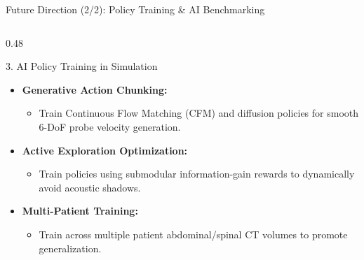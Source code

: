 \documentclass{if-beamer}
\begin{document}
\begin{frame}{Future Direction (2/2): Policy Training \& AI Benchmarking}
    \begin{columns}[T]
        \begin{column}{0.48\textwidth}
            \begin{block}{3. AI Policy Training in Simulation}
                \begin{itemize}\itemsep=3pt
                    \item \textbf{Generative Action Chunking:}
                    \begin{itemize}\itemsep=1pt
                        \item Train Continuous Flow Matching (CFM) and diffusion policies for smooth 6-DoF probe velocity generation.
                    \end{itemize}
                    \item \textbf{Active Exploration Optimization:}
                    \begin{itemize}\itemsep=1pt
                        \item Train policies using submodular information-gain rewards to dynamically avoid acoustic shadows.
                    \end{itemize}
                    \item \textbf{Multi-Patient Training:}
                    \begin{itemize}\itemsep=1pt
                        \item Train across multiple patient abdominal/spinal CT volumes to promote generalization.
                    \end{itemize}
                \end{itemize}
            \end{block}
        \end{column}


\end{columns}
\end{frame}
\end{document}
